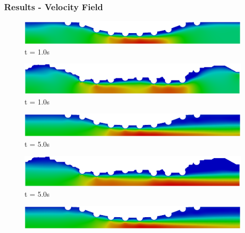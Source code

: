 \begin{frame}
 \frametitle{\LARGE Results - Velocity Field}

\vspace{-0.8cm}
\begin{figure}
     \begin{minipage}{.50\linewidth}
      \centering
      \includegraphics[scale=0.12]{images/vel_CurvedStrut3.png}\\
      \tiny t = 1.0s
     \end{minipage}%
     \begin{minipage}{.50\linewidth}
      \centering
      \includegraphics[scale=0.12]{images/vel_RealStrut3.png}\\
      \tiny t = 1.0s
     \end{minipage}
     \begin{minipage}{.50\linewidth}
     \smallskip
      \centering
      \includegraphics[scale=0.12]{images/vel_CurvedStrut5.png}\\
      \tiny t = 5.0s
     \end{minipage}%
     \begin{minipage}{.50\linewidth}
     \smallskip
      \centering
      \includegraphics[scale=0.12]{images/vel_RealStrut5.png}\\
      \tiny t = 5.0s
     \end{minipage}
     \begin{minipage}{.50\linewidth}
      \centering
      \includegraphics[scale=0.12]{images/vel_CurvedStrut8.png}\\

\end{minipage}
\end{figure}
\end{frame}

